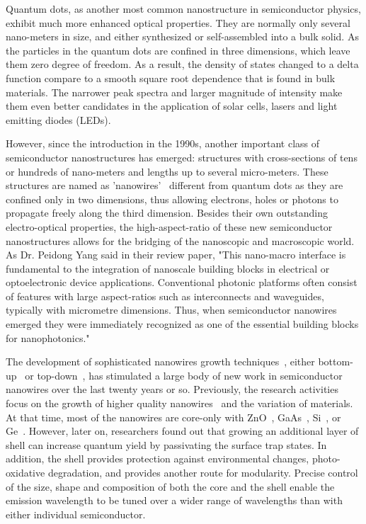 Quantum dots, as another most common nanostructure in semiconductor physics,
exhibit much more enhanced optical properties. They are normally only several
nano-meters in size, and either synthesized or self-assembled into a bulk
solid. As the particles in the quantum dots are confined in three dimensions,
which leave them zero degree of freedom. As a result, the density of states
changed to a delta function compare to a smooth square root dependence that is
found in bulk materials. The narrower peak spectra and larger magnitude of
intensity make them even better candidates in the application of solar cells,
lasers and light emitting diodes (LEDs).

However, since the introduction in the 1990s, another important class of
semiconductor nanostructures has emerged: structures with cross-sections of
tens or hundreds of nano-meters and lengths up to several micro-meters. These
structures are named as 'nanowires'~\cite{xia2003one} different from quantum
dots as they are confined only in two dimensions, thus allowing electrons,
holes or photons to propagate freely along the third dimension. Besides their
own outstanding electro-optical properties, the high-aspect-ratio of these new
semiconductor nanostructures allows for the bridging of the nanoscopic and
macroscopic world. As Dr. Peidong Yang said in their review paper, "This
nano-macro interface is fundamental to the integration of nanoscale building
blocks in electrical or optoelectronic device applications. Conventional
photonic platforms often consist of features with large aspect-ratios such as
interconnects and waveguides, typically with micrometre dimensions. Thus, when
semiconductor nanowires emerged they were immediately recognized as one of the
essential building blocks for nanophotonics."~\cite{Yan:2009hm}

The development of sophisticated nanowires growth
techniques~\cite{hobbs2012semiconductor,wu2001direct}, either
bottom-up~\cite{lu2007nanoelectronics,Huang:2001kv} or
top-down~\cite{park2009top}, has stimulated a large body of new work in
semiconductor nanowires over the last twenty years or so. Previously, the
research activities focus on the growth of higher quality
nanowires~\cite{Yang:2002ts} and the variation of materials. At that time, most
of the nanowires are core-only with ZnO~\cite{Yang:2002ts},
GaAs~\cite{persson2004solid}, Si~\cite{hochbaum2005controlled}, or
Ge~\cite{wu2000germanium}. However, later on, researchers found out that
growing an additional layer of shell can increase quantum yield by passivating
the surface trap states. In addition, the shell provides protection against
environmental changes, photo-oxidative degradation, and provides another route
for modularity. Precise control of the size, shape and composition of both the
core and the shell enable the emission wavelength to be tuned over a wider
range of wavelengths than with either individual semiconductor.

